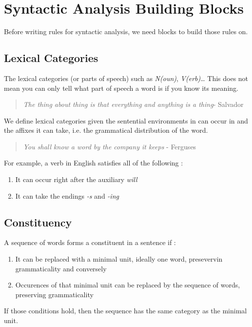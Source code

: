 \documentclass{cours}
\begin{document}
\section{Syntactic Analysis Building Blocks}
Before writing rules for syntactic analysis, we need blocks to build those rules on.

\subsection{Lexical Categories}
The lexical categories (or parts of speech) such as \textsl{N(oun)}, \textsl{V(erb)}\dots 
This does not mean you can only tell what part of speech a word is if you know its meaning.\\
\begin{quotation}
    \og \textit{The thing about thing is that everything and anything is a thing}\fg - Salvador
\end{quotation}

\begin{definition}
    We define lexical categories given the sentential environments in can occur in and the affixes it can take, i.e. the grammatical distribution of the word.
\end{definition}
\begin{quotation}
    \og \textit{You shall know a word by the company it keeps} \fg - Ferguses
\end{quotation}
For example, a verb in English satisfies all of the following :
\begin{enumerate}
    \item It can occur right after the auxiliary \textsl{will}
    \item It can take the endings \textsl{-s} and \textsl{-ing}
\end{enumerate}

\subsection{Constituency}
\begin{definition}[A Heuristic]
    A sequence of words forms a constituent in a sentence if :
    \begin{enumerate}
        \item It can be replaced with a minimal unit, ideally one word, presevervin grammaticality and conversely
        \item Occurences of that minimal unit can be replaced by the sequence of words, preserving grammaticality
    \end{enumerate}
    If those conditions hold, then the sequence has the same category as the minimal unit. 
\end{definition}
\end{document}

